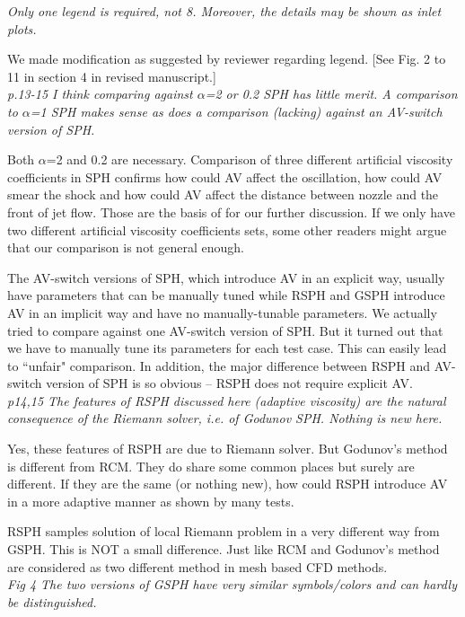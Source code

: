 \documentclass[10pt,a4paper]{article}
\begin{document}
\textit{Only one legend is required, not 8. Moreover, the details may be shown as inlet plots.} 

We made modification as suggested by reviewer regarding legend. 
[See Fig. 2 to 11 in section 4 in revised manuscript.]\\[3pt]

\textit{p.13-15 I think comparing against $\alpha$=2 or 0.2 SPH has little merit.
A comparison to $\alpha$=1 SPH makes sense as does a comparison (lacking)
against an AV-switch version of SPH.}

Both $\alpha$=2 and 0.2 are necessary. Comparison of three different artificial viscosity coefficients in SPH confirms how could AV affect the oscillation, how could AV smear the shock and how could AV affect the distance between nozzle and the front of jet flow. Those are the basis of for our further discussion. If we only have two different artificial viscosity coefficients sets, some other readers might argue that our comparison is not general enough.

The AV-switch versions of SPH, which introduce AV in an explicit way, usually have parameters that can be manually tuned while RSPH and GSPH introduce AV in an implicit way and have no manually-tunable parameters. 
We actually tried to compare against one AV-switch version of SPH. But it turned out that we have to manually tune its parameters for each test case. This can easily lead to ``unfair" comparison. In addition, the major difference between RSPH and AV-switch version of SPH is so obvious -- RSPH does not require explicit AV.
\\[3pt]

\textit{p14,15 The features of RSPH discussed here (adaptive viscosity) are the
natural consequence of the Riemann solver, i.e. of Godunov SPH. Nothing
is new here.}

Yes, these features of RSPH are due to Riemann solver. 
But Godunov's method is different from RCM.
They do share some common places but surely are different. If they are the same (or nothing new), how could RSPH introduce AV in a more adaptive manner as shown by many tests.

RSPH samples solution of local Riemann problem in a very different way from GSPH. This is NOT a small difference. Just like RCM and Godunov's method are considered as two different method in mesh based CFD methods.
\\[3pt]

\textit{Fig 4 The two versions of GSPH have very similar symbols/colors and can hardly be distinguished.}
\end{document}
